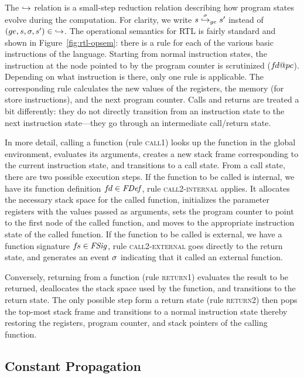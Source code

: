The $\stackrel{}{\hookrightarrow}$ relation is a small-step reduction relation describing how program states evolve
during the computation.  For clarity, we write $s \stackrel{\sigma}{\hookrightarrow}_{ge} s'$ instead of
$(ge,s,\sigma,s')\in {\stackrel{}{\hookrightarrow}}$.  The operational semantics for RTL is fairly standard and shown in
Figure~\ref{fig:rtl-opsem}: there is a rule for each of the various basic instructions of the
language.  Starting from normal instruction states, the instruction at the node pointed to by the
program counter is scrutinized ($\vfd@pc$).  Depending on what instruction is there, only one rule
is applicable.  The corresponding rule calculates the new values of the registers, the memory (for
store instructions), and the next program counter.  Calls and returns are treated a bit differently:
they do not directly transition from an instruction state to the next instruction state---they go
through an intermediate call/return state.

In more detail, calling a function (rule \textsc{call1}) looks up the function in the global
environment, evaluates its arguments, creates a new stack frame corresponding to the current
instruction state, and transitions to a call state.  From a call state, there are two possible
execution steps.  If the function to be called is internal, \ie we have its function definition
${f\hspace*{-1pt}d}\in\mathit{FDef}$, rule \textsc{call2-internal} applies.  It allocates the necessary stack space for
the called function, initializes the parameter registers with the values passed as arguments, sets
the program counter to point to the first node of the called function, and moves to the appropriate
instruction state of the called function.  If the function to be called is external, \ie we have a
function signature ${f\hspace*{-1pt}s}\in\mathit{FSig}$, rule \textsc{call2-external} goes directly to the return
state, and generates an event $\sigma$ indicating that it called an external function.

Conversely, returning from a function (rule \textsc{return1}) evaluates the result to be returned,
deallocates the stack space used by the function, and transitions to the return state.  The only
possible step form a return state (rule \textsc{return2}) then pops the top-most stack frame and
transitions to a normal instruction state thereby restoring the registers, program counter, and
stack pointers of the calling function.



\subsection{Constant Propagation}
\label{sec:background:constprop}

